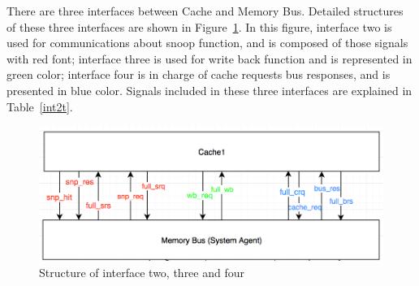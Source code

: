 \documentclass[12pt,frontmatter,copyright,thesis]{usfmanus}
\begin{document}
There are three interfaces between Cache and Memory Bus. Detailed
structures of these three interfaces are shown in Figure~\ref{int2}.
In this figure, interface two is used for
communications about snoop function, and is composed of those signals with red font;
interface three is used for write back function and is represented in green color;
interface four is in charge of cache requests bus responses, and is
presented in blue color. Signals included in these three interfaces are
explained in Table~\ref{int2t}.
\begin{figure}[h]
\centering
    \includegraphics[width=5in]{int2.png}
    \caption{Structure of interface two, three and four}
    \label{int2}
 \end{figure}
\end{document}
